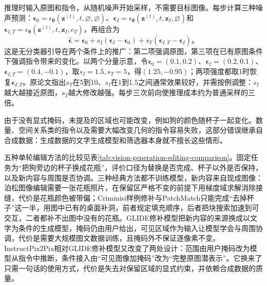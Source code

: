 推理时输入原图和指令，从随机噪声开始采样，不需要目标图像。每步计算三种噪声预测：$\bm{\epsilon}_0=\epsilon_{\bm{\theta}}(\bm{z}^{(t)},t,\varnothing,\varnothing)$、$\bm{\epsilon}_I=\epsilon_{\bm{\theta}}(\bm{z}^{(t)},t,\bm{z}_I,\varnothing)$和$\bm{\epsilon}_{I,T}=\epsilon_{\bm{\theta}}(\bm{z}^{(t)},t,\bm{z}_I,c_T)$，再组合为
\begin{equation}
 \hat{\bm{\epsilon}}
 =\bm{\epsilon}_0
  +s_I(\bm{\epsilon}_I-\bm{\epsilon}_0)
  +s_T(\bm{\epsilon}_{I,T}-\bm{\epsilon}_I)\text{。}
 \label{eq:vision-instruct-guidance}
\end{equation}
这是无分类器引导在两个条件上的推广：第二项强调原图，第三项在已有原图条件下强调指令带来的变化。以两个分量示意，令$\bm{\epsilon}_0=(0.1,0.2)$、$\bm{\epsilon}_I=(0.2,0.1)$、$\bm{\epsilon}_{I,T}=(0.4,-0.1)$，取$s_I=1.5,s_T=5$，得$(1.25,-0.95)$；两项强度都取1时恢复$\bm{\epsilon}_{I,T}$。原论文指出$s_T$在5到10、$s_I$在1到1.5之间通常效果较好，并需按例调整：$s_I$越大越接近原图，$s_T$越大修改越强。每步三次前向使推理成本约为普通采样的三倍。

由于没有显式掩码，未提及的区域也可能改变，例如狗的颜色随杯子一起变化。数量、空间关系类的指令以及需要大幅改变几何的指令容易失败，这部分错误继承自合成数据：生成数据的文字生成模型和筛选器本身就不擅长这些情形。

五种单轮编辑方法的比较见表\ref{tab:vision-generation-editing-comparison}。固定任务为“把狗旁边的杯子换成花瓶”，评价口径为替换是否完成、杯子以外是否保持，以及新内容与周围是否协调。三种经典方法都不训练模型，新内容来自现成图像：泊松图像编辑需要一张花瓶照片，在保留区严格不变的前提下用梯度域求解消除接缝，代价是花瓶颜色被带偏；Criminisi样例修补与PatchMatch只能完成“去掉杯子”这一半，用图中已有的桌面补洞，前者规定填充顺序，后者把块搜索加速到可交互，二者都补不出图中没有的花瓶。GLIDE修补模型把新内容的来源换成以文字为条件的生成模型，掩码仍由用户给出，可见区域作为输入让模型学会与周围协调，代价是需要大规模图文数据训练，且掩码外不保证逐像素不变。InstructPix2Pix相对GLIDE修补模型又改变了两处设计：范围由用户掩码改为模型从指令中推断，条件接入由“可见图像加掩码”改为“完整原图潜表示”。它换来了只需一句话的使用方式，代价是失去对保留区域的显式约束，并依赖合成数据的质量。

